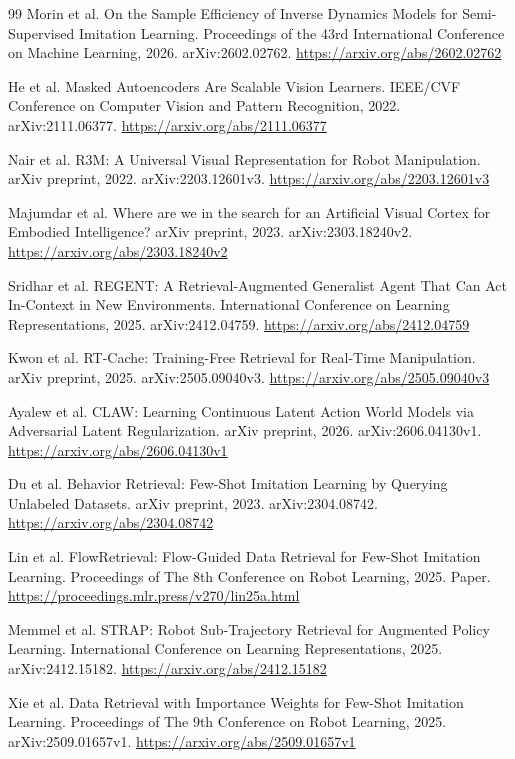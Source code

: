 \documentclass[11pt,a4paper]{article}
\begin{document}
\begin{thebibliography}{99}
Morin et al. On the Sample Efficiency of Inverse Dynamics Models for Semi-Supervised Imitation Learning. Proceedings of the 43rd International Conference on Machine Learning, 2026. arXiv:2602.02762. \url{https://arxiv.org/abs/2602.02762}

He et al. Masked Autoencoders Are Scalable Vision Learners. IEEE/CVF Conference on Computer Vision and Pattern Recognition, 2022. arXiv:2111.06377. \url{https://arxiv.org/abs/2111.06377}

Nair et al. R3M: A Universal Visual Representation for Robot Manipulation. arXiv preprint, 2022. arXiv:2203.12601v3. \url{https://arxiv.org/abs/2203.12601v3}

Majumdar et al. Where are we in the search for an Artificial Visual Cortex for Embodied Intelligence? arXiv preprint, 2023. arXiv:2303.18240v2. \url{https://arxiv.org/abs/2303.18240v2}

Sridhar et al. REGENT: A Retrieval-Augmented Generalist Agent That Can Act In-Context in New Environments. International Conference on Learning Representations, 2025. arXiv:2412.04759. \url{https://arxiv.org/abs/2412.04759}

Kwon et al. RT-Cache: Training-Free Retrieval for Real-Time Manipulation. arXiv preprint, 2025. arXiv:2505.09040v3. \url{https://arxiv.org/abs/2505.09040v3}

Ayalew et al. CLAW: Learning Continuous Latent Action World Models via Adversarial Latent Regularization. arXiv preprint, 2026. arXiv:2606.04130v1. \url{https://arxiv.org/abs/2606.04130v1}

Du et al. Behavior Retrieval: Few-Shot Imitation Learning by Querying Unlabeled Datasets. arXiv preprint, 2023. arXiv:2304.08742. \url{https://arxiv.org/abs/2304.08742}

Lin et al. FlowRetrieval: Flow-Guided Data Retrieval for Few-Shot Imitation Learning. Proceedings of The 8th Conference on Robot Learning, 2025. Paper. \url{https://proceedings.mlr.press/v270/lin25a.html}

Memmel et al. STRAP: Robot Sub-Trajectory Retrieval for Augmented Policy Learning. International Conference on Learning Representations, 2025. arXiv:2412.15182. \url{https://arxiv.org/abs/2412.15182}

Xie et al. Data Retrieval with Importance Weights for Few-Shot Imitation Learning. Proceedings of The 9th Conference on Robot Learning, 2025. arXiv:2509.01657v1. \url{https://arxiv.org/abs/2509.01657v1}


\end{thebibliography}
\end{document}
